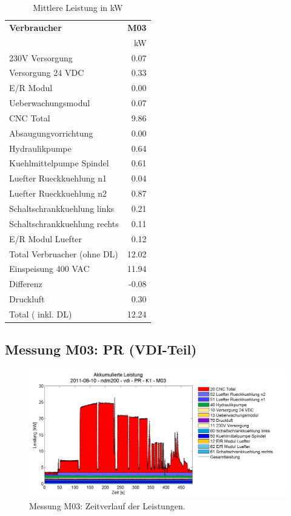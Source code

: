 \documentclass[a4paper,11pt,pdftex,twoside]{scrartcl}
\begin{document}
\begin{table}[H]
\begin{center}
\caption{Mittlere Leistung in kW}
\label{tab:meas_power}
\begin{tabular}{lr}
 {\bf Verbraucher}  & {\bf M03} \\
  & kW  \\
\hline
 230V Versorgung   & 0.07  \\
 Versorgung 24 VDC   & 0.33  \\
 E/R Modul   & 0.00  \\
 Ueberwachungsmodul   & 0.07  \\
 CNC Total   & 9.86   \\
 Absaugungvorrichtung   & 0.00  \\
 Hydraulikpumpe   & 0.64  \\
 Kuehlmittelpumpe Spindel   & 0.61  \\
 Luefter Rueckkuehlung n1   & 0.04  \\
 Luefter Rueckkuehlung n2   & 0.87  \\
  Schaltschrankkuehlung links   & 0.21  \\
 Schaltschrankkuehlung rechts   & 0.11  \\
 E/R Modul Luefter   & 0.12  \\
\hline
Total Verbruacher (ohne DL)&12.02\\
 Einspeisung 400 VAC   & 11.94  \\
\hline
Differenz&-0.08\\
\hline
 Druckluft   & 0.30   \\
\hline
Total ( inkl. DL)&12.24\\
\hline
\end{tabular}
\end{center}
\end{table}
\pagebreak



\subsection{Messung M03: PR (VDI-Teil)}

\begin{figure}[H]
\begin{center}
  \includegraphics[width=\columnwidth]{figures/2011-06-10_ndm200_vdi_PR_K1_M031_area.png}
  \caption{Messung M03: Zeitverlauf der Leistungen.}
  \label{fig:M03_area}
\end{center}
\end{figure}
\end{document}
